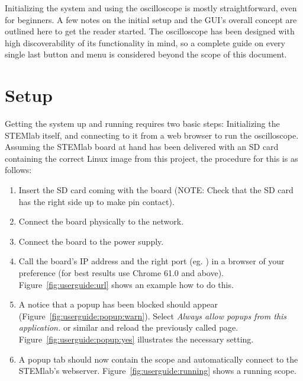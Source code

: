%
%

Initializing the system and using  the oscilloscope is mostly straightforward,
even for  beginners. A few notes  on the initial  setup and the  GUI's overall
concept are outlined here to get the reader started. The oscilloscope has been
designed with high discoverability of its functionality in mind, so a complete
guide on every single  last button and menu is considered  beyond the scope of
this document.

%
%
\chapter{Setup} %
\label{ch:userguide:setup}

Getting the system  up and running requires two  basic steps: Initializing the
STEMlab  itself,  and  connecting  to  it  from  a  web  browser  to  run  the
oscilloscope.  Assuming the  STEMlab board at hand has been  delivered with an
SD  card containing  the  correct Linux  image from  this  project, the procedure
for this is as follows:
\begin{enumerate}
    \item 
        Insert the SD card coming with the board (NOTE: Check that the SD card
        has the right side up to make pin contact).
    \item 
        Connect the board physically to the network.
    \item 
        Connect the board to the power supply.
    \item 
        Call    the    board's    IP    address    and    the    right    port
        (eg.    )    in    a    browser    of
        your   preference   (for   best    results   use   Chrome   61.0   and
        above). Figure~\ref{fig:userguide:url} shows  an example  how to
        do this.
    \item   A  notice   that  a   popup   has  been   blocked  should   appear
        (Figure~\ref{fig:userguide:popup:warn}). Select   \emph{Always   allow
        popups from  this application.} or  similar and reload  the previously
        called   page. Figure~\ref{fig:userguide:popup:yes}  illustrates   the
        necessary setting.
    \item A popup  tab should now contain the scope  and automatically connect
        to the STEMlab's webserver. Figure~\ref{fig:userguide:running} shows a
        running scope.
\end{enumerate}

